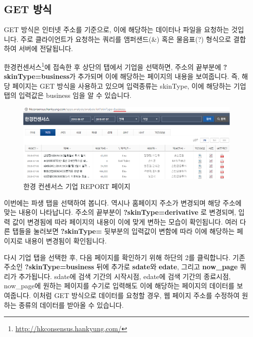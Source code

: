 \documentclass[12pt,]{book}
\let\rmarkdownfootnote\footnote%
\def\footnote{\protect\rmarkdownfootnote}
\begin{document}
\hypertarget{get-}{%
\subsection{GET 방식}\label{get-}}

GET 방식은 인터넷 주소를 기준으로, 이에 해당하는 데이터나 파일을 요청하는 것입니다. 주로 클라이언트가 요청하는 쿼리를 앰퍼샌드(\&) 혹은 물음표(?) 형식으로 결합하여 서버에 전달됩니다.

한경컨센서스\footnote{\url{http://hkconsensus.hankyung.com/}}에 접속한 후 상단의 탭에서 기업을 선택하면, 주소의 끝부분에 \textbf{?skinType=business}가 추가되며 이에 해당하는 페이지의 내용을 보여줍니다. 즉, 해당 페이지는 GET 방식을 사용하고 있으며 입력종류는 skinType, 이에 해당하는 기업 탭의 입력값은 business 임을 알 수 있습니다.

\begin{figure}[h]

{\centering \includegraphics[width=1\linewidth]{images/crawl_hk} 

}

\caption{한경 컨센서스 기업 REPORT 페이지}\label{fig:unnamed-chunk-3}
\end{figure}

이번에는 파생 탭을 선택하여 봅니다. 역시나 홈페이지 주소가 변경되며 해당 주소에 맞는 내용이 나타납니다. 주소의 끝부분이 \textbf{?skinType=derivative} 로 변경되며, 입력 값이 변경됨에 따라 페이지의 내용이 이에 맞게 변하는 모습이 확인됩니다. 여러 다른 탭들을 눌러보면 \textbf{?skinType=} 뒷부분의 입력값이 변함에 따라 이에 해당하는 페이지로 내용이 변경됨이 확인됩니다.

다시 기업 탭을 선택한 후, 다음 페이지를 확인하기 위해 하단의 2를 클릭합니다. 기존 주소인 \textbf{?skinType=business} 뒤에 추가로 \textbf{sdate}와 \textbf{edate}, 그리고 \textbf{now\_page} 쿼리가 추가됩니다. sdate에 검색 기간의 시작시점, edate에 검색 기간의 종료시점, now\_page에 원하는 페이지를 수기로 입력해도 이에 해당하는 페이지의 데이터를 보여줍니다. 이처럼 GET 방식으로 데이터를 요청할 경우, 웹 페이지 주소를 수정하여 원하는 종류의 데이터를 받아올 수 있습니다.
\end{document}
